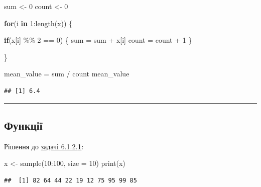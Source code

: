 \documentclass[
]{book}
\newenvironment{Shaded}{\begin{snugshade}}{\end{snugshade}}
\newcommand{\AttributeTok}[1]{\textcolor[rgb]{0.77,0.63,0.00}{#1}}
\newcommand{\ControlFlowTok}[1]{\textcolor[rgb]{0.13,0.29,0.53}{\textbf{#1}}}
\newcommand{\DecValTok}[1]{\textcolor[rgb]{0.00,0.00,0.81}{#1}}
\newcommand{\FunctionTok}[1]{\textcolor[rgb]{0.00,0.00,0.00}{#1}}
\newcommand{\NormalTok}[1]{#1}
\newcommand{\OtherTok}[1]{\textcolor[rgb]{0.56,0.35,0.01}{#1}}
\newcommand{\SpecialCharTok}[1]{\textcolor[rgb]{0.00,0.00,0.00}{#1}}
\begin{document}
\begin{Shaded}
\begin{Highlighting}[]
\NormalTok{sum }\OtherTok{\textless{}{-}} \DecValTok{0}
\NormalTok{count }\OtherTok{\textless{}{-}} \DecValTok{0}

\ControlFlowTok{for}\NormalTok{(i }\ControlFlowTok{in} \DecValTok{1}\SpecialCharTok{:}\FunctionTok{length}\NormalTok{(x)) \{}
  
  \ControlFlowTok{if}\NormalTok{(x[i] }\SpecialCharTok{\%\%} \DecValTok{2} \SpecialCharTok{==} \DecValTok{0}\NormalTok{) \{}
\NormalTok{    sum }\OtherTok{=}\NormalTok{ sum }\SpecialCharTok{+}\NormalTok{ x[i]}
\NormalTok{    count }\OtherTok{=}\NormalTok{ count }\SpecialCharTok{+} \DecValTok{1}
\NormalTok{  \}}
  
\NormalTok{\}}

\NormalTok{mean\_value }\OtherTok{=}\NormalTok{ sum }\SpecialCharTok{/}\NormalTok{ count}
\NormalTok{mean\_value}
\end{Highlighting}
\end{Shaded}

\begin{verbatim}
## [1] 6.4
\end{verbatim}

\begin{center}\rule{0.5\linewidth}{0.5pt}\end{center}

\hypertarget{chapter622}{%
\subsection{Функції}\label{chapter622}}

Рішення до \protect\hyperlink{task6121}{задачі 6.1.2.\textbf{1}}:

\begin{Shaded}
\begin{Highlighting}[]
\NormalTok{x }\OtherTok{\textless{}{-}} \FunctionTok{sample}\NormalTok{(}\DecValTok{10}\SpecialCharTok{:}\DecValTok{100}\NormalTok{, }\AttributeTok{size =} \DecValTok{10}\NormalTok{)}
\FunctionTok{print}\NormalTok{(x)}
\end{Highlighting}
\end{Shaded}

\begin{verbatim}
##  [1] 82 64 44 22 19 12 75 95 99 85
\end{verbatim}
\end{document}
